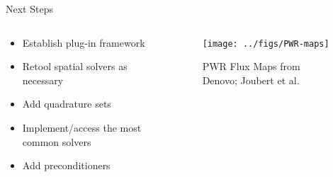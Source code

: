 \documentclass[xcolor=x11names,compress]{beamer}
\renewcommand{\(}{\begin{columns}}
\renewcommand{\)}{\end{columns}}
\newcommand{\<}[1]{\begin{column}{#1}}
\renewcommand{\>}{\end{column}}
\begin{document}
\begin{frame}{Next Steps}

    \begin{columns}
    \begin{column}{0.5\textwidth}
        \begin{itemize}
        \item Establish plug-in framework
        \item Retool spatial solvers as necessary
        \item Add quadrature sets
        \item Implement/access the most common solvers
        \item Add preconditioners
        \end{itemize}
  	\end{column}
 	\begin{column}{0.4\textwidth}
        \begin{center}
 	    \begin{figure}
 	    \texttt{[image: ../figs/PWR-maps]}
 	    \caption{PWR Flux Maps from Denovo; Joubert et al.}
        \end{figure}
 	    \end{center}
  	\end{column}
	\end{columns}
    
\end{frame}

\end{document}
